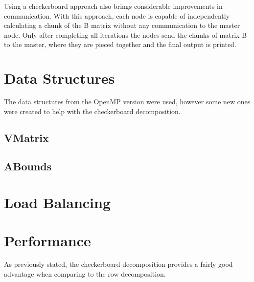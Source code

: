 \documentclass[a4paper]{article}
\begin{document}

Using a checkerboard approach also brings considerable improvements in communication. 
With this approach, each node is capable of independently calculating a chunk of the
B matrix without any communication to the master node. Only after completing all 
iterations the nodes send the chunks of matrix B to the master, where they are
pieced together and the final output is printed.

\section{Data Structures}
The data structures from the OpenMP version were used, however some new ones were
created to help with the checkerboard decomposition.
\subsection{VMatrix}

\subsection{ABounds}
 

\section{Load Balancing}

\section{Performance}
As previously stated, the checkerboard decomposition provides a fairly good advantage 
when comparing to the row decomposition. 



 

\end{document}
